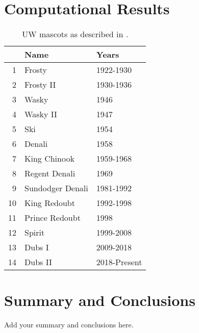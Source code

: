 \documentclass{artikel3}
\begin{document}
\section{Computational Results}
\begin{table}
    \centering
    \begin{tabular}{rll}
           & Name             & Years        \\
        \hline
        1  & Frosty           & 1922-1930    \\
        2  & Frosty II        & 1930-1936    \\
        3  & Wasky            & 1946         \\
        4  & Wasky II         & 1947         \\
        5  & Ski              & 1954         \\
        6  & Denali           & 1958         \\
        7  & King Chinook     & 1959-1968    \\
        8  & Regent Denali    & 1969         \\
        9  & Sundodger Denali & 1981-1992    \\
        10 & King Redoubt     & 1992-1998    \\
        11 & Prince Redoubt   & 1998         \\
        12 & Spirit           & 1999-2008    \\
        13 & Dubs I           & 2009-2018    \\
        14 & Dubs II          & 2018-Present
    \end{tabular}
    \caption{UW mascots as described in \cite{washington_huskies}.}
    \label{tab:mascots}
\end{table}


\section{Summary and Conclusions}
Add your summary and conclusions here.
\end{document}
